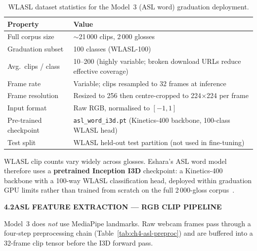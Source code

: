 \begin{table}[H]
\centering
\caption{WLASL dataset statistics for the Model~3 (ASL word) graduation deployment.}
\label{tab:ch4-wlasl-stats}
\small
\renewcommand{\arraystretch}{1.4} %
\begin{tabular}{|P{4.5cm}|P{9.0cm}|}
\hline
\textbf{Property} & \textbf{Value} \\ \hline
Full corpus size & $\sim$21\,000 clips, 2\,000 glosses \\ \hline
Graduation subset & 100 classes (WLASL-100) \\ \hline
Avg.\ clips / class & 10--200 (highly variable; broken download URLs reduce effective coverage) \\ \hline
Frame rate & Variable; clips resampled to 32 frames at inference \\ \hline
Frame resolution & Resized to 256 then centre-cropped to 224$\times$224 per frame \\ \hline
Input format & Raw RGB, normalised to $[-1,1]$ \\ \hline
Pre-trained checkpoint & \texttt{asl\_\allowbreak word\_\allowbreak i3d.pt} (Kinetics-400 backbone, 100-class WLASL head) \\ \hline
Test split & WLASL held-out test partition (not used in fine-tuning) \\ \hline
\end{tabular}
\end{table}
\vspace{0.4cm}

\noindent WLASL clip counts vary widely across glosses. Eshara's ASL word model therefore uses a \textbf{pretrained Inception I3D} checkpoint: a Kinetics-400 backbone with a 100-way WLASL classification head, deployed within graduation GPU limits rather than trained from scratch on the full 2\,000-gloss corpus~\cite{li2020wlasl}.\par\vspace{0.6cm}

\clearpage
\noindent\textbf{4.2\quad ASL FEATURE EXTRACTION --- RGB CLIP PIPELINE}\par
{}
\vspace{0.4cm}

\noindent Model~3 does \emph{not} use MediaPipe landmarks. Raw webcam frames pass through a four-step preprocessing chain (Table~\ref{tab:ch4-asl-preproc}) and are buffered into a 32-frame clip tensor before the I3D forward pass.\par\vspace{0.4cm}

